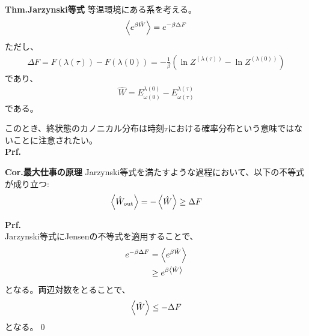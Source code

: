 \documentclass[a4paper,11pt]{jsarticle}
\numberwithin{equation}{section}
\begin{document}
\begin{itembox}[l]{\textbf{Thm.Jarzynski等式}}
  等温環境にある系を考える。%
  \begin{align} 
    \ev{e^{\beta \hat{W}}} = e^{-\beta \Delta F}
  \end{align}
  ただし、
    \begin{align}
        \Delta F = F(\lambda(\tau)) - F(\lambda(0)) = -\frac{1}{\beta}(\ln Z^{(\lambda(\tau))} - \ln Z^{(\lambda(0))})
    \end{align}
    であり、
    \begin{align}
        \hat{W} = E_{{\omega}(0)}^{\lambda(0)} - E_{{\omega}(\tau)}^{\lambda(\tau)}
    \end{align}
    である。
\end{itembox}
このとき、終状態のカノニカル分布は時刻$\tau$における確率分布という意味ではないことに注意されたい。\\
\textbf{Prf.}\\

\begin{itembox}[l]{\textbf{Cor.最大仕事の原理}}
  Jarzynski等式を満たすような過程において、以下の不等式が成り立つ:
  \begin{align}
    \ev{\hat{W}_{\text{out}}} = -\ev{\hat{W}} \geq \Delta F
  \end{align}
\end{itembox}
\textbf{Prf.}\\
Jarzynski等式にJensenの不等式を適用することで、
\begin{align}
  e^{-\beta \Delta F} &= \ev{e^{\beta \hat{W}}}\\
  &\geq e^{\beta \ev{\hat{W}}}
\end{align}
となる。両辺対数をとることで、
\begin{align}
  \ev{\hat{W}} \leq -\Delta F
\end{align}
となる。\qed
\end{document}
